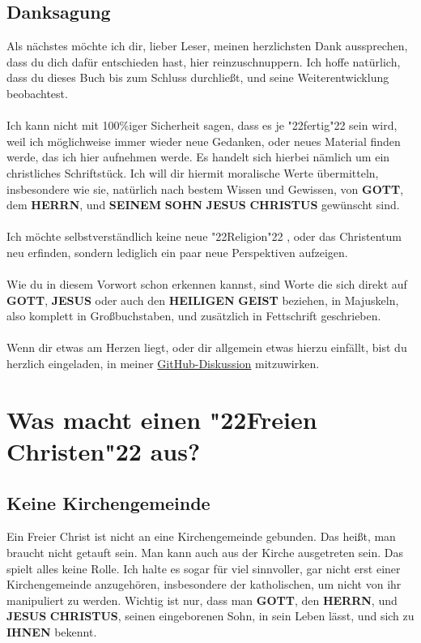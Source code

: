 \documentclass[12pt,a5paper]{article}
\newcommand{\Christus}[0]{\textbf{CHRISTUS}}
\newcommand{\Geist}[0]{\textbf{GEIST}}
\newcommand{\Gott}[0]{\textbf{GOTT}}
\newcommand{\Heiligen}[0]{\textbf{HEILIGEN}}
\newcommand{\Herrn}[0]{\textbf{HERRN}}
\newcommand{\Ihnen}[0]{\textbf{IHNEN}}
\newcommand{\Jesus}[0]{\textbf{JESUS}}
\newcommand{\Seinem}[0]{\textbf{SEINEM}}
\newcommand{\Sohn}[0]{\textbf{SOHN}}
\newcommand{\q}[1]{\char"22{#1}\char"22 }
\begin{document}
	\subsection{Danksagung}
		Als n\"achstes m\"ochte ich dir,
		lieber Leser,
		meinen herzlichsten Dank aussprechen,
		dass du dich daf\"ur entschieden hast,
		hier reinzuschnuppern.
		Ich hoffe nat\"urlich,
		dass du dieses Buch bis zum Schluss durchlie{\ss}t,
		und seine Weiterentwicklung beobachtest.
		\\
		\\
		Ich kann nicht mit 100\%iger Sicherheit sagen,
		dass es je \q{fertig} sein wird,
		weil ich m\"oglichweise immer wieder neue Gedanken,
		oder neues Material finden werde,
		das ich hier aufnehmen werde.
		Es handelt sich hierbei n\"amlich um ein christliches Schriftst\"uck.
		Ich will dir hiermit moralische Werte \"ubermitteln,
		insbesondere wie sie,
		nat\"urlich nach bestem Wissen und Gewissen,
		von {\Gott},
		dem {\Herrn},
		und {\Seinem} {\Sohn} {\Jesus} {\Christus} gew\"unscht sind.
		\\
		\\
		Ich m\"ochte selbstverst\"andlich keine neue \q{Religion},
		oder das Christentum neu erfinden,
		sondern lediglich ein paar neue Perspektiven aufzeigen.
		\\
		\\
		Wie du in diesem Vorwort schon erkennen kannst,
		sind Worte die sich direkt auf {\Gott},
		{\Jesus} oder auch den {\Heiligen} {\Geist} beziehen,
		in Majuskeln,
		also komplett in Gro{\ss}buchstaben,
		und zus\"atzlich in Fettschrift geschrieben.
		\\
		\\
		Wenn dir etwas am Herzen liegt,
		oder dir allgemein etwas hierzu einf\"allt,
		bist du herzlich eingeladen,
		in meiner \href{https://github.com/DerRobert-28/Der-Freie-Christ/discussions}{GitHub-Diskussion} mitzuwirken.
	
	\newpage
	\section{Was macht einen \q{Freien Christen} aus?}
	
	\subsection{Keine Kirchengemeinde}
		Ein Freier Christ ist nicht an eine Kirchengemeinde gebunden.
		Das hei{\ss}t,
		man braucht nicht getauft sein.
		Man kann auch aus der Kirche ausgetreten sein.
		Das spielt alles keine Rolle.
		Ich halte es sogar f\"ur viel sinnvoller,
		gar nicht erst einer Kirchengemeinde anzugeh\"oren,
		insbesondere der katholischen,
		um nicht von ihr manipuliert zu werden.
		Wichtig ist nur,
		dass man {\Gott},
		den {\Herrn},
		und {\Jesus} {\Christus},
		seinen eingeborenen Sohn,
		in sein Leben l\"asst,
		und sich zu {\Ihnen} bekennt.
	
\end{document}
